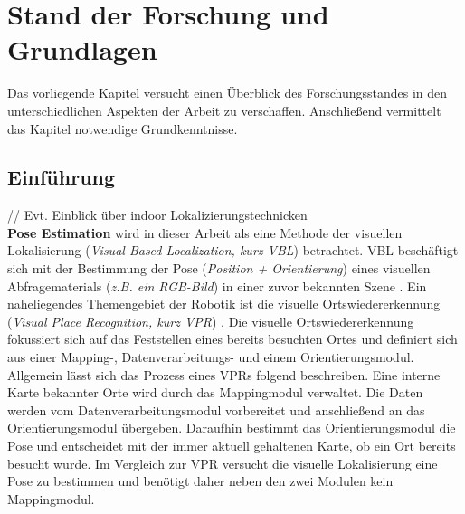 \pagebreak
\section{Stand der Forschung und Grundlagen}

Das vorliegende Kapitel versucht einen Überblick des Forschungsstandes in den unterschiedlichen Aspekten der Arbeit zu verschaffen. Anschließend vermittelt das Kapitel notwendige Grundkenntnisse.

\subsection{Einführung}



// Evt. Einblick über indoor Lokalizierungstechnicken \\

\textbf{Pose Estimation} wird in dieser Arbeit als eine Methode der visuellen Lokalisierung (\textit{Visual-Based Localization, kurz VBL}) betrachtet. VBL beschäftigt sich mit der Bestimmung der Pose (\textit{Position + Orientierung}) eines visuellen Abfragematerials (\textit{z.B. ein RGB-Bild}) in einer zuvor bekannten Szene  \cite{piascoSurveyVisualBasedLocalization2018}.
Ein naheliegendes Themengebiet der Robotik ist die visuelle Ortswiedererkennung (\textit{Visual Place Recognition, kurz VPR}) \cite{lowryVisualPlaceRecognition2016}. Die visuelle Ortswiedererkennung fokussiert sich auf das Feststellen eines bereits besuchten Ortes und definiert sich aus einer Mapping-, Datenverarbeitungs- und einem Orientierungsmodul. Allgemein lässt sich das Prozess eines VPRs folgend beschreiben. Eine interne Karte bekannter Orte wird durch das Mappingmodul verwaltet. Die Daten werden vom Datenverarbeitungsmodul vorbereitet und anschließend an das Orientierungsmodul übergeben. Daraufhin bestimmt das Orientierungsmodul die Pose und entscheidet mit der immer aktuell gehaltenen Karte, ob ein Ort bereits besucht wurde. Im Vergleich zur VPR versucht die visuelle Lokalisierung eine Pose zu bestimmen und benötigt daher neben den zwei Modulen kein Mappingmodul.

